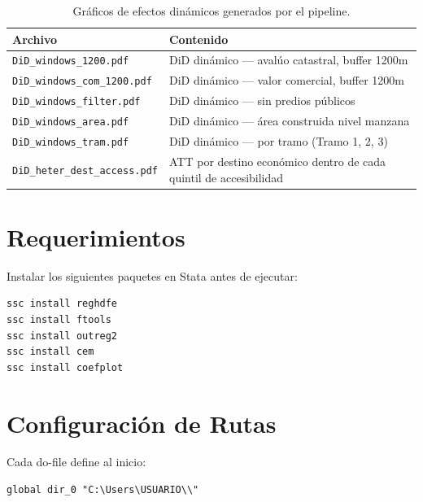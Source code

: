 \documentclass[12pt, a4paper]{article}
\begin{document}
\begin{table}[h!]
\centering
\begin{tabular}{@{}L{5cm} L{9.5cm}@{}}
\toprule
\textbf{Archivo} & \textbf{Contenido} \\
\midrule
\texttt{DiD\_windows\_1200.pdf} & DiD dinámico — avalúo catastral, buffer 1200m \\
\texttt{DiD\_windows\_com\_1200.pdf} & DiD dinámico — valor comercial, buffer 1200m \\
\texttt{DiD\_windows\_filter.pdf} & DiD dinámico — sin predios públicos \\
\texttt{DiD\_windows\_area.pdf} & DiD dinámico — área construida nivel manzana \\
\texttt{DiD\_windows\_tram.pdf} & DiD dinámico — por tramo (Tramo 1, 2, 3) \\
\texttt{DiD\_heter\_dest\_access.pdf} & ATT por destino económico dentro de cada quintil de accesibilidad \\
\bottomrule
\end{tabular}
\caption{Gráficos de efectos dinámicos generados por el pipeline.}
\end{table}

\section{Requerimientos}

Instalar los siguientes paquetes en Stata antes de ejecutar:

\begin{lstlisting}[language={}]
ssc install reghdfe
ssc install ftools
ssc install outreg2
ssc install cem
ssc install coefplot
\end{lstlisting}

\section{Configuración de Rutas}

Cada do-file define al inicio:

\begin{lstlisting}[language={}]
global dir_0 "C:\Users\USUARIO\\"
\end{lstlisting}
\end{document}
